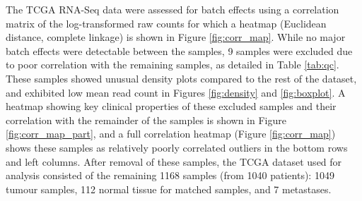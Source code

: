 The TCGA RNA-Seq data were assessed for batch effects using a correlation matrix of the log-transformed raw counts for which a heatmap (Euclidean distance, complete linkage) is shown in Figure \ref{fig:corr_map}. While no major batch effects were detectable between the samples, 9 samples were excluded due to poor correlation with the remaining samples, as detailed in Table \ref{tab:qc}. These samples showed unusual density plots compared to the rest of the dataset, and exhibited low mean read count in Figures \ref{fig:density} and \ref{fig:boxplot}. A heatmap showing key clinical properties of these excluded samples and their correlation with the remainder of the samples is shown in Figure \ref{fig:corr_map_part}, and a full correlation heatmap (Figure \ref{fig:corr_map}) shows these samples as relatively poorly correlated outliers in the bottom rows and left columns.
After removal of these samples, the TCGA dataset used for analysis consisted of the remaining 1168 samples (from 1040 patients): 1049 tumour samples, 112 normal tissue for matched samples, and 7 metastases.

